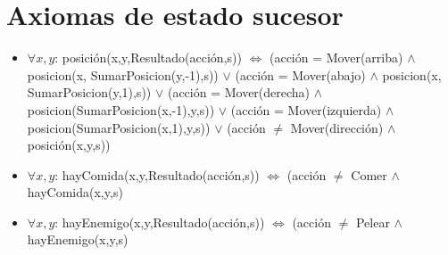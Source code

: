 \section{Axiomas de estado sucesor}

\begin{itemize}

\item $\forall x,y$: posición(x,y,Resultado(acción,s)) $\Leftrightarrow$
\newline (acción = Mover(arriba) $\land$ posicion(x, SumarPosicion(y,-1),s))
\newline $\lor$
\newline (acción = Mover(abajo) $\land$ posicion(x, SumarPosicion(y,1),s))
\newline $\lor$
\newline (acción = Mover(derecha) $\land$ posicion(SumarPosicion(x,-1),y,s))
\newline $\lor$
\newline (acción = Mover(izquierda) $\land$ posicion(SumarPosicion(x,1),y,s))
\newline $\lor$
\newline (acción $\ne$ Mover(dirección) $\land$ posición(x,y,s))

\item $\forall x,y$: hayComida(x,y,Resultado(acción,s)) $\Leftrightarrow$
\newline (acción $\ne$ Comer $\land$ hayComida(x,y,s)

\item $\forall x,y$: hayEnemigo(x,y,Resultado(acción,s)) $\Leftrightarrow$
\newline (acción $\ne$ Pelear $\land$ hayEnemigo(x,y,s)

\end{itemize}

